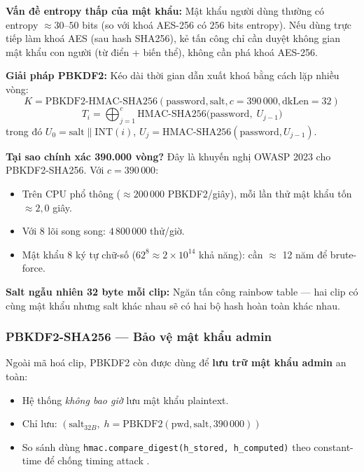 \textbf{Vấn đề entropy thấp của mật khẩu:} Mật khẩu người dùng thường có entropy $\approx 30$--$50$ bits (so với khoá AES-256 có $256$ bits entropy). Nếu dùng trực tiếp làm khoá AES (sau hash SHA256), kẻ tấn công chỉ cần duyệt không gian mật khẩu con người (từ điển + biến thể), không cần phá khoá AES-256.

\textbf{Giải pháp PBKDF2:} Kéo dài thời gian dẫn xuất khoá bằng cách lặp nhiều vòng:
\begin{equation}
    K = \text{PBKDF2-HMAC-SHA256}(\text{password}, \text{salt}, c=390\,000, \text{dkLen}=32)
\end{equation}
\begin{equation}
    T_i = \bigoplus_{j=1}^{c} \text{HMAC-SHA256}\big(\text{password},\; U_{j-1}\big)
\end{equation}
trong đó $U_0 = \text{salt} \| \text{INT}(i)$, $U_j = \text{HMAC-SHA256}(\text{password}, U_{j-1})$.

\textbf{Tại sao chính xác 390.000 vòng?} Đây là khuyến nghị OWASP 2023 cho PBKDF2-SHA256. Với $c = 390\,000$:
\begin{itemize}
    \item Trên CPU phổ thông ($\approx 200\,000$ PBKDF2/giây), mỗi lần thử mật khẩu tốn $\approx 2,0$ giây.
    \item Với 8 lõi song song: $4\,800\,000$ thử/giờ.
    \item Mật khẩu 8 ký tự chữ-số ($62^8 \approx 2 \times 10^{14}$ khả năng): cần $\approx$ 12 năm để brute-force.
\end{itemize}

\textbf{Salt ngẫu nhiên 32 byte mỗi clip:} Ngăn tấn công rainbow table --- hai clip có cùng mật khẩu nhưng salt khác nhau sẽ có hai bộ hash hoàn toàn khác nhau.

\subsubsection{PBKDF2-SHA256 --- Bảo vệ mật khẩu admin}
\label{subsubsec:pbkdf2_admin}

Ngoài mã hoá clip, PBKDF2 còn được dùng để \textbf{lưu trữ mật khẩu admin} an toàn:
\begin{itemize}
    \item Hệ thống \textit{không bao giờ} lưu mật khẩu plaintext.
    \item Chỉ lưu: $(\text{salt}_{32B}, \; h = \text{PBKDF2}(\text{pwd}, \text{salt}, 390\,000))$
    \item So sánh dùng \texttt{hmac.compare\_digest(h\_stored, h\_computed)} theo constant-time để chống timing attack \cite{timing_attack}.
\end{itemize}

